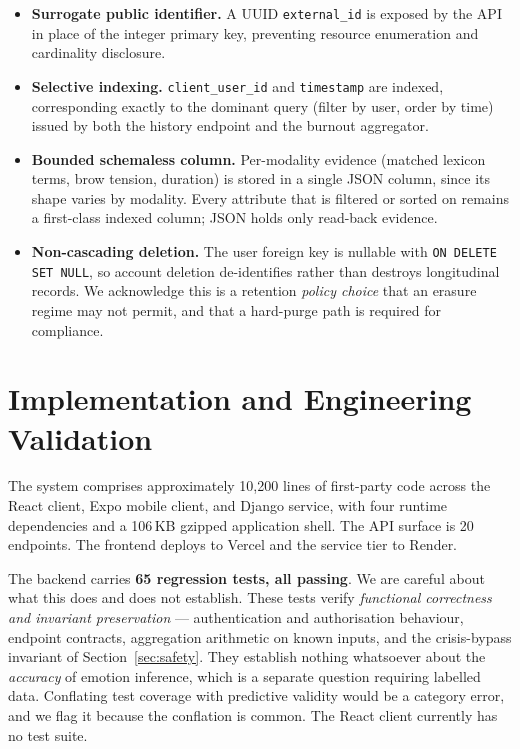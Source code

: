 \documentclass[conference]{IEEEtran}
\begin{document}
\begin{itemize}
\item \textbf{Surrogate public identifier.} A UUID \texttt{external\_id} is
exposed by the API in place of the integer primary key, preventing resource
enumeration and cardinality disclosure.
\item \textbf{Selective indexing.} \texttt{client\_user\_id} and
\texttt{timestamp} are indexed, corresponding exactly to the dominant query
(filter by user, order by time) issued by both the history endpoint and the
burnout aggregator.
\item \textbf{Bounded schemaless column.} Per-modality evidence (matched
lexicon terms, brow tension, duration) is stored in a single JSON column,
since its shape varies by modality. Every attribute that is filtered or
sorted on remains a first-class indexed column; JSON holds only read-back
evidence.
\item \textbf{Non-cascading deletion.} The user foreign key is nullable with
\texttt{ON DELETE SET NULL}, so account deletion de-identifies rather than
destroys longitudinal records. We acknowledge this is a retention
\emph{policy choice} that an erasure regime may not permit, and that a
hard-purge path is required for compliance.
\end{itemize}

\section{Implementation and Engineering Validation}

The system comprises approximately 10{,}200 lines of first-party code across
the React client, Expo mobile client, and Django service, with four runtime
dependencies and a 106\,KB gzipped application shell. The API surface is 20
endpoints. The frontend deploys to Vercel and the service tier to Render.

The backend carries \textbf{65 regression tests, all passing}. We are careful
about what this does and does not establish. These tests verify
\emph{functional correctness and invariant preservation} --- authentication and
authorisation behaviour, endpoint contracts, aggregation arithmetic on known
inputs, and the crisis-bypass invariant of Section~\ref{sec:safety}. They
establish nothing whatsoever about the \emph{accuracy} of emotion inference,
which is a separate question requiring labelled data. Conflating test coverage
with predictive validity would be a category error, and we flag it because the
conflation is common. The React client currently has no test suite.
\end{document}
